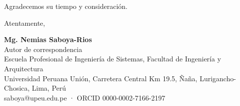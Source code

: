 \documentclass[11pt]{article}
\begin{document}
Agradecemos su tiempo y consideración.

Atentamente,

\vspace{1.2cm}
{\setlength{\parskip}{0pt}\small \textbf{Mg. Nemias Saboya-Rios}\\Autor de correspondencia\\Escuela Profesional de Ingeniería de Sistemas, Facultad de Ingeniería y Arquitectura\\Universidad Peruana Unión, Carretera Central Km 19.5, Ñaña, Lurigancho-Chosica, Lima, Perú\\saboya@upeu.edu.pe · ORCID 0000-0002-7166-2197\par}
\end{document}
